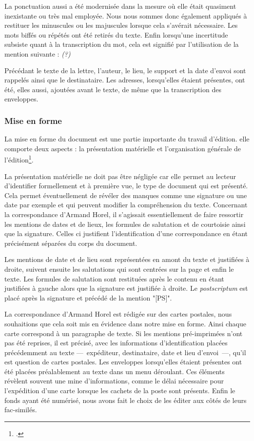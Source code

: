 \documentclass[12pt,a4paper]{book} %
\begin{document}
La ponctuation aussi a été modernisée dans la mesure où elle était quasiment inexistante ou très mal employée. Nous nous sommes donc également appliqués à restituer les minuscules ou les majuscules lorsque cela s'avérait  nécessaire. Les mots biffés ou répétés ont été retirés du texte. Enfin lorsqu'une incertitude subsiste quant à la transcription du mot, cela est signifié par l'utilisation de la mention suivante : \og \textit{(?)} \fg{} %

Précédant le texte de la lettre, l'auteur, le lieu, le support et la date d'envoi sont rappelés ainsi que le destinataire. Les adresses, lorsqu'elles étaient présentes, ont été, elles aussi, ajoutées avant le texte, de même que la transcription des enveloppes.%
\subsubsection{Mise en forme}
La mise en forme du document est une partie importante du travail d'édition. elle comporte deux aspects : la présentation matérielle et l'organisation générale de l'édition\footcite[p. 73]{nougaret_ledition_2015}.
\medskip

La présentation matérielle ne doit pas être négligée car  elle permet au lecteur d'identifier formellement et à première vue, le type de document qui est présenté. Cela permet éventuellement de révéler des manques comme une signature ou une date par exemple et qui peuvent modifier la compréhension du texte. Concernant la correspondance d'Armand Horel, il s'agissait essentiellement de faire ressortir les mentions de dates et de lieux, les formules de salutation et de courtoisie ainsi que la signature. Celles ci justifient l'identification d'une correspondance en étant précisément  séparées du corps du document.

Les mentions de date et de lieu sont représentées en amont du texte et justifiées à droite, suivent ensuite les salutations qui sont centrées sur la page et enfin le texte. Les formules de salutation sont restituées après le contenu en étant justifiées à gauche alors que la signature est justifiée à droite. Le \textit{postscriptum} est placé après la signature et précédé de la mention "[PS]".

La correspondance d'Armand Horel est rédigée sur des cartes postales, nous souhaitions que cela soit mis en évidence dans notre mise en forme. Ainsi chaque carte correspond à un paragraphe de texte. Si les mentions pré-imprimées n'ont pas été reprises, il est précisé, avec les informations d'identification placées précédemment au texte ---~expéditeur, destinataire, date et lieu d'envoi~---, qu'il est question de cartes postales. Les enveloppes lorsqu'elles étaient présentes ont été placées préalablement au texte dans un menu déroulant. Ces éléments révèlent souvent une mine d'informations, comme le délai nécessaire pour l'expédition d'une carte lorsque les cachets de la poste sont présents. Enfin le fonds ayant été numérisé, nous avons fait le choix de les éditer aux côtés de leurs fac-similés. 
\end{document}
